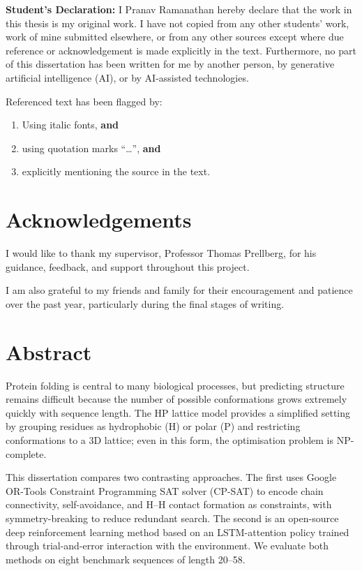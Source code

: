 \documentclass[12pt, oneside, openany]{book}
\theoremstyle{plain}
\theoremstyle{definition}
\begin{document}
{\bf Student's Declaration:}
I Pranav Ramanathan hereby declare that the work in this thesis 
is my original work. I have not copied from any other students' work, 
work of mine submitted elsewhere,  or from any other sources except where due 
reference or acknowledgement is made explicitly in the text. 
Furthermore, no part of this dissertation has been written for me by another person,
by generative artificial intelligence (AI), or by AI-assisted technologies.  
 



Referenced text has been flagged by:
\begin{enumerate}
\item Using italic fonts, {\bf and} %
\item using quotation marks ``\ldots '', {\bf and}
\item explicitly mentioning the source in the text.
\end{enumerate}


\newpage

\chapter*{Acknowledgements}
I would like to thank my supervisor, Professor Thomas Prellberg, for his guidance, feedback, and support throughout this project.

I am also grateful to my friends and family for their encouragement and patience over the past year, particularly during the final stages of writing.

\chapter*{Abstract}
Protein folding is central to many biological processes, but predicting structure remains difficult because the number of possible conformations grows extremely quickly with sequence length. The HP lattice model provides a simplified setting by grouping residues as hydrophobic (H) or polar (P) and restricting conformations to a 3D lattice; even in this form, the optimisation problem is NP-complete.

This dissertation compares two contrasting approaches. The first uses Google OR-Tools Constraint Programming SAT solver (CP-SAT) to encode chain connectivity, self-avoidance, and H--H contact formation as constraints, with symmetry-breaking to reduce redundant search. The second is an open-source deep reinforcement learning method based on an LSTM-attention policy trained through trial-and-error interaction with the environment. We evaluate both methods on eight benchmark sequences of length 20--58.
\end{document}
